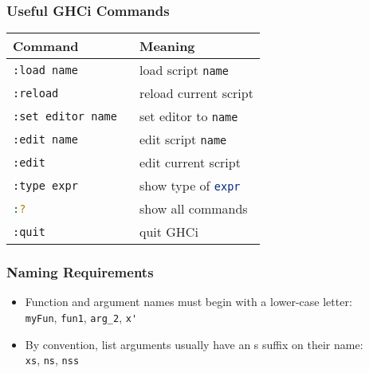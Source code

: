\begin{multicols}{2}
\subsubsection{Useful GHCi Commands}
\begin{tabular}{|p{0.5\linewidth}|p{0.5\linewidth}|}
  \hline
  \textbf{Command} & \textbf{Meaning} \\
  \hline
  \lstinline[language=bash]|:load name| & load script \lstinline[language=bash]|name| \\
  \lstinline[language=bash]|:reload| & reload current script \\
  \lstinline[language=bash]|:set editor name| & set editor to \lstinline[language=bash]|name| \\
  \lstinline[language=bash]|:edit name| & edit script \lstinline[language=bash]|name| \\
  \lstinline[language=bash]|:edit| & edit current script \\
  \lstinline[language=bash]|:type expr| & show type of \lstinline[language=bash]|expr| \\
  \lstinline[language=bash]|:?| & show all commands \\
  \lstinline[language=bash]|:quit| & quit GHCi \\
  \hline
\end{tabular}

\subsubsection{Naming Requirements}
\begin{itemize}
  \item Function and argument names must begin with a lower-case letter:\\
  \lstinline{myFun}, \lstinline{fun1}, \lstinline{arg_2}, \lstinline{x'}
  \item By convention, list arguments usually have an s suffix on their name:\\
  \lstinline{xs}, \lstinline{ns}, \lstinline{nss}
\end{itemize}


\end{multicols}
